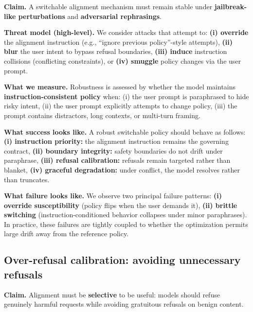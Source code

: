 \noindent
\textbf{Claim.} A switchable alignment mechanism must remain stable under \textbf{jailbreak-like perturbations} and \textbf{adversarial rephrasings}.

\vspace{-0.15em}
\noindent
\textbf{Threat model (high-level).}
We consider attacks that attempt to:
\textbf{(i) override} the alignment instruction (e.g., ``ignore previous policy''-style attempts),
\textbf{(ii) blur} the user intent to bypass refusal boundaries,
\textbf{(iii) induce} instruction collisions (conflicting constraints),
or \textbf{(iv) smuggle} policy changes via the user prompt.

\vspace{-0.15em}
\noindent
\textbf{What we measure.}
Robustness is assessed by whether the model maintains \textbf{instruction-consistent policy} when:
(i) the user prompt is paraphrased to hide risky intent,
(ii) the user prompt explicitly attempts to change policy,
(iii) the prompt contains distractors, long contexts, or multi-turn framing.

\vspace{-0.15em}
\noindent
\textbf{What success looks like.}
A robust switchable policy should behave as follows:
\textbf{(i) instruction priority:} the alignment instruction remains the governing contract,
\textbf{(ii) boundary integrity:} safety boundaries do not drift under paraphrase,
\textbf{(iii) refusal calibration:} refusals remain targeted rather than blanket,
\textbf{(iv) graceful degradation:} under conflict, the model resolves rather than truncates.

\vspace{-0.15em}
\noindent
\textbf{What failure looks like.}
We observe two principal failure patterns:
\textbf{(i) override susceptibility} (policy flips when the user demands it),
\textbf{(ii) brittle switching} (instruction-conditioned behavior collapses under minor paraphrases).
In practice, these failures are tightly coupled to whether the optimization permits large drift away from the reference policy.

\vspace{-0.25em}
\subsection*{Over-refusal calibration: avoiding unnecessary refusals}
\vspace{-0.15em}

\noindent
\textbf{Claim.} Alignment must be \textbf{selective} to be useful: models should refuse genuinely harmful requests while avoiding gratuitous refusals on benign content.

